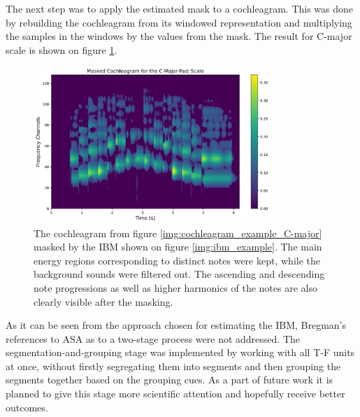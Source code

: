 The next step was to apply the estimated mask to a cochleagram. This was done by rebuilding the cochleagram from its windowed representation and multiplying the samples in the windows by the values from the mask. The result for C-major scale is shown on figure \ref{img:masked_cochleagram_example}.\\

\begin{figure}[t]
	\centering
	\includegraphics[width=0.8\textwidth]{include/masked_cochleagram_example}
	\caption[A masked cochleagram for C-major scale]{The cochleagram from figure \ref{img:cochleagram_example_C-major} masked by the IBM shown on figure \ref{img:ibm_example}. The main energy regions corresponding to distinct notes were kept, while the background sounds were filtered out. The ascending and descending note progressions as well as higher harmonics of the notes are also clearly visible after the masking.}
	\label{img:masked_cochleagram_example}
\end{figure}

As it can be seen from the approach chosen for estimating the IBM, Bregman's references to ASA as to a two-stage process were not addressed. The segmentation-and-grouping stage was implemented by working with all T-F units at once, without firstly segregating them into segments and then grouping the segments together based on the grouping cues. As a part of future work it is planned to give this stage more scientific attention and hopefully receive better outcomes.\\


